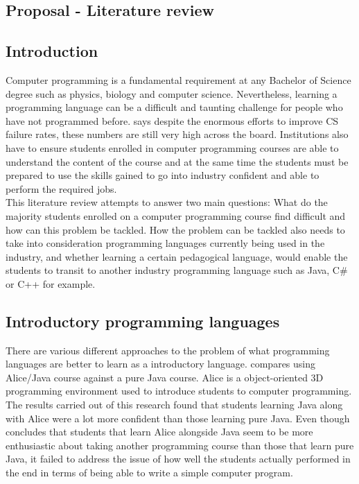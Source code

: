 \documentclass[a4paper]{article}
\begin{document}
\begin{appendices}
	\newpage
	\section{Proposal - Literature review}
	\label{App:LitReview}
	\subsection{Introduction}
	Computer programming is a fundamental requirement at any Bachelor of Science degree such as physics, biology and computer science. Nevertheless, learning a programming language can be a difficult and taunting challenge for people who have not programmed before. \textcite{VihavainenAiraksinenWatson2014} says despite the enormous efforts to improve CS failure rates, these numbers are still very high across the board. Institutions also have to ensure students enrolled in computer programming courses are able to understand the content of the course and at the same time the students must be prepared to use the skills gained to go into industry confident and able to perform the required jobs. \parencite{KrpanBilobrk2011}\\
	
	This literature review attempts to answer two main questions: What do the majority students enrolled on a computer programming course find difficult and how can this problem be tackled. How the problem can be tackled also needs to take into consideration programming languages currently being used in the industry, and whether learning a certain pedagogical language, would enable the students to transit to another industry programming language such as Java, C\# or C++ for example.
	
	\subsection{Introductory programming languages}
	There are various different approaches to the problem of what programming languages are better to learn as a introductory language. \textcite{Daly2011} compares using Alice/Java course against a pure Java course. Alice is a object-oriented 3D programming environment used to introduce students to computer programming. The results carried out of this research found that students learning Java along with Alice were a lot more confident than those learning pure Java. Even though \textcite{Daly2011} concludes that students that learn Alice alongside Java seem to be more enthusiastic about taking another programming course than those that learn pure Java, it failed to address the issue of how well the students actually performed in the end in terms of being able to write a simple computer program.\\
	

\end{appendices}
\end{document}
